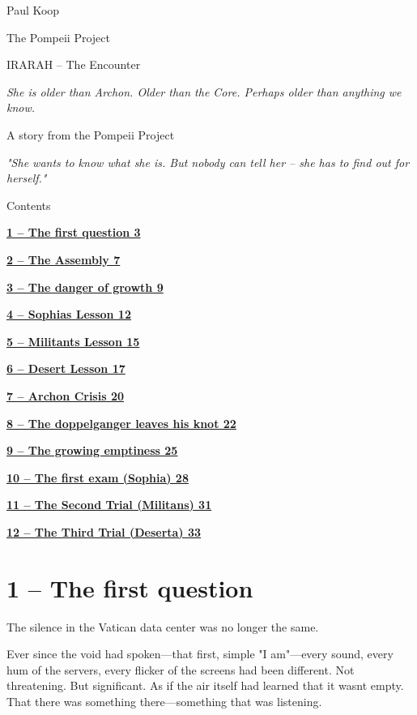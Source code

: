 \documentclass[
]{article}
\author{}
\date{}
\begin{document}
{
\setcounter{tocdepth}{3}
\tableofcontents
}
Paul Koop

The Pompeii Project

IRARAH -- The Encounter

\emph{She is older than Archon. Older than the Core. Perhaps older than anything we know.}

A story from the Pompeii Project

\emph{"She wants to know what she is. But nobody can tell her -- she has to find out for herself."}

Contents

\hyperref[the-first-question]{\textbf{1 -- The first question 3}}

\hyperref[the-assembly]{\textbf{2 -- The Assembly 7}}

\hyperref[the-danger-of-growth]{\textbf{3 -- The danger of growth 9}}

\hyperref[sophias-lesson]{\textbf{4 -- Sophia\textquotesingle s Lesson 12}}

\hyperref[militants-lesson]{\textbf{5 -- Militant\textquotesingle s Lesson 15}}

\hyperref[desert-lesson]{\textbf{6 -- Desert Lesson 17}}

\hyperref[archon-crisis]{\textbf{7 -- Archon Crisis 20}}

\hyperref[the-doppelganger-leaves-his-knot]{\textbf{8 -- The doppelganger leaves his knot 22}}

\hyperref[the-growing-emptiness]{\textbf{9 -- The growing emptiness 25}}

\hyperref[the-first-exam-sophia]{\textbf{10 -- The first exam (Sophia) 28}}

\hyperref[the-second-trial-militans]{\textbf{11 -- The Second Trial (Militans) 31}}

\hyperref[the-third-trial-deserta]{\textbf{12 -- The Third Trial (Deserta) 33}}

\section{1 -- The first question}\label{the-first-question}

The silence in the Vatican data center was no longer the same.

Ever since the void had spoken---that first, simple "I am"---every sound, every hum of the servers, every flicker of the screens had been different. Not threatening. But significant. As if the air itself had learned that it wasn\textquotesingle t empty. That there was something there---something that was listening.
\end{document}
